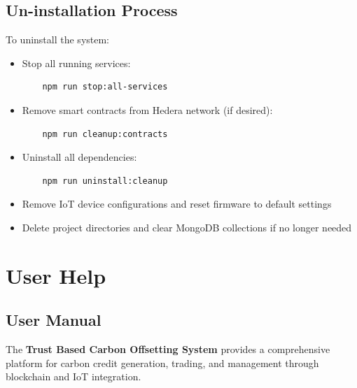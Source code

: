 \documentclass[oneside,a4paper,12pt]{book}
\begin{document}
\subsection{Un-installation Process}
To uninstall the system:
\begin{itemize}
    \item Stop all running services:
    \begin{verbatim}
    npm run stop:all-services
    \end{verbatim}
    \item Remove smart contracts from Hedera network (if desired):
    \begin{verbatim}
    npm run cleanup:contracts
    \end{verbatim}
    \item Uninstall all dependencies:
    \begin{verbatim}
    npm run uninstall:cleanup
    \end{verbatim}
    \item Remove IoT device configurations and reset firmware to default settings
    \item Delete project directories and clear MongoDB collections if no longer needed
\end{itemize}

\section{User Help}

\subsection{User Manual}
The \textbf{Trust Based Carbon Offsetting System} provides a comprehensive platform for carbon credit generation, trading, and management through blockchain and IoT integration.
\end{document}
